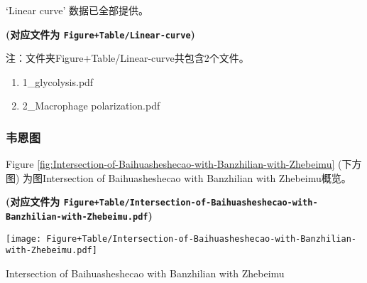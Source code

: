 \documentclass[
]{article}
\providecommand{\tightlist}{%
  \setlength{\itemsep}{0pt}\setlength{\parskip}{0pt}}
\begin{document}
\begin{center}\vspace{1.5cm}\end{center}

\begin{center}\vspace{1.5cm}\end{center}

`Linear curve' 数据已全部提供。

\textbf{(对应文件为 \texttt{Figure+Table/Linear-curve})}

\begin{center}\begin{tcolorbox}[colback=gray!10, colframe=gray!50, width=0.9\linewidth, arc=1mm, boxrule=0.5pt]注：文件夹Figure+Table/Linear-curve共包含2个文件。

\begin{enumerate}\tightlist
\item 1\_glycolysis.pdf
\item 2\_Macrophage polarization.pdf
\end{enumerate}\end{tcolorbox}
\end{center}

\begin{center}\vspace{1.5cm}\end{center}

\hypertarget{ux97e6ux6069ux56fe}{%
\subsubsection{韦恩图}\label{ux97e6ux6069ux56fe}}

\begin{center}\vspace{1.5cm}\end{center}

Figure \ref{fig:Intersection-of-Baihuasheshecao-with-Banzhilian-with-Zhebeimu} (下方图) 为图Intersection of Baihuasheshecao with Banzhilian with Zhebeimu概览。

\textbf{(对应文件为 \texttt{Figure+Table/Intersection-of-Baihuasheshecao-with-Banzhilian-with-Zhebeimu.pdf})}

\def\@captype{figure}
\begin{center}
\texttt{[image: Figure+Table/Intersection-of-Baihuasheshecao-with-Banzhilian-with-Zhebeimu.pdf]}
\caption{Intersection of Baihuasheshecao with Banzhilian with Zhebeimu}\label{fig:Intersection-of-Baihuasheshecao-with-Banzhilian-with-Zhebeimu}
\end{center}
\end{document}
